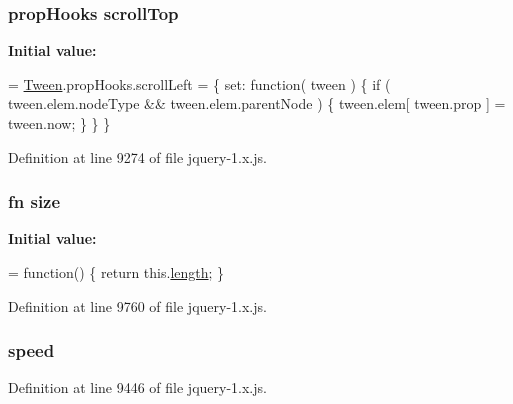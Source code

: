 \subsubsection[{\texorpdfstring{scroll\+Top}{scrollTop}}]{ {\bf prop\+Hooks} scroll\+Top}\hypertarget{jquery-1_8x_8js_a57beb1f611d6c8b84919b0f7d9e0e890}{}\label{jquery-1_8x_8js_a57beb1f611d6c8b84919b0f7d9e0e890}
{\bfseries Initial value\+:}
\begin{DoxyCode}
= \hyperlink{jquery-1_8x_8js_a91e55267cc469e865a6a7c6cfc51c7b1}{Tween}.propHooks.scrollLeft = \{
    \textcolor{keyword}{set}: \textcolor{keyword}{function}( tween ) \{
        \textcolor{keywordflow}{if} ( tween.elem.nodeType && tween.elem.parentNode ) \{
            tween.elem[ tween.prop ] = tween.now;
        \}
    \}
\}
\end{DoxyCode}


Definition at line 9274 of file jquery-\/1.\+x.\+js.

\subsubsection[{\texorpdfstring{size}{size}}]{ {\bf fn} size}\hypertarget{jquery-1_8x_8js_afa6806c6ee5e63d5177f1dcc082ba6bc}{}\label{jquery-1_8x_8js_afa6806c6ee5e63d5177f1dcc082ba6bc}
{\bfseries Initial value\+:}
\begin{DoxyCode}
= \textcolor{keyword}{function}() \{
    \textcolor{keywordflow}{return} this.\hyperlink{xpresseditor_8min_8js_a8251a40bc2803d85bf8a918f1f288cce}{length};
\}
\end{DoxyCode}


Definition at line 9760 of file jquery-\/1.\+x.\+js.

\subsubsection[{\texorpdfstring{speed}{speed}}]{ speed}\hypertarget{jquery-1_8x_8js_add98c90065e6563cba26ff6d2016c46c}{}\label{jquery-1_8x_8js_add98c90065e6563cba26ff6d2016c46c}


Definition at line 9446 of file jquery-\/1.\+x.\+js.

